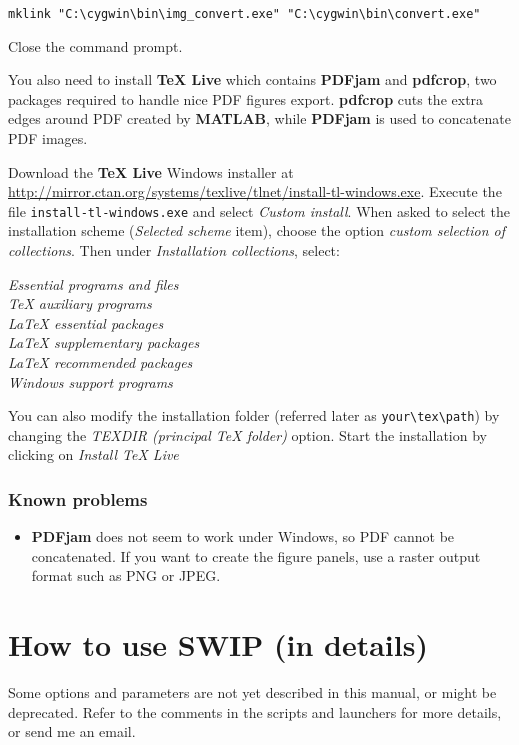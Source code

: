 \documentclass[twoside,a4paper]{article}
\def\SWIP{\textbf{SWIP}}
\def\PDFjam{\textbf{PDFjam}}
\def\pdfcrop{\textbf{pdfcrop}}
\def\MATLAB{\textbf{MATLAB}}
\begin{document}
\verb|mklink "C:\cygwin\bin\img_convert.exe" "C:\cygwin\bin\convert.exe"|

Close the command prompt.

You also need to install \textbf{TeX Live} which contains {\PDFjam} and {\pdfcrop}, two packages required to handle nice PDF figures export. {\pdfcrop} cuts the extra edges around PDF created by {\MATLAB}, while {\PDFjam} is used to concatenate PDF images.

Download the \textbf{TeX Live} Windows installer at \url{http://mirror.ctan.org/systems/texlive/tlnet/install-tl-windows.exe}. Execute the file \verb|install-tl-windows.exe| and select \textit{Custom install}. When asked to select the installation scheme (\textit{Selected scheme} item), choose the option \textit{custom selection of collections}. Then under \textit{Installation collections}, select:

\textit{Essential programs and files}\\
\textit{TeX auxiliary programs}\\
\textit{LaTeX essential packages}\\
\textit{LaTeX supplementary packages}\\
\textit{LaTeX recommended packages}\\
\textit{Windows support programs}

You can also modify the installation folder (referred later as \verb|your\tex\path|) by changing the \textit{TEXDIR (principal TeX folder)} option. Start the installation by clicking on \textit{Install TeX Live}

\subsubsection{Known problems}
\begin{itemize}
\setlength\itemsep{2ex}
\setlength{\parindent}{5ex}
\item {\PDFjam} does not seem to work under Windows, so PDF cannot be concatenated. If you want to create the figure panels, use a raster output format such as PNG or JPEG.

\end{itemize}

\clearpage
\section{How to use {\SWIP} (in details)}
Some options and parameters are not yet described in this manual, or might be deprecated. Refer to the comments in the scripts and launchers for more details, or send me an email.
\end{document}
